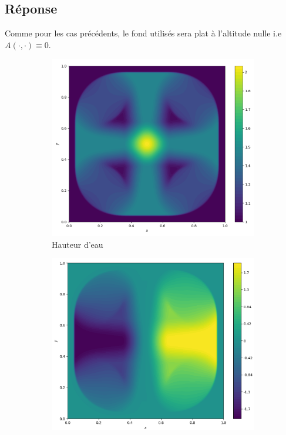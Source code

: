 \documentclass[
	french,
	11pt, %
]{fphw}
\begin{document}
\subsection*{Réponse} 
Comme pour les cas précédents, le fond utilisés sera plat à l'altitude nulle i.e $A(\cdot,\cdot) \equiv 0$. 


\begin{figure}[H]
	\centering
	\begin{subfigure}{0.32\textwidth}
		\centering
		\includegraphics[width=\textwidth,height=0.85\textwidth]{Riem3h.png}
		\caption{Hauteur d'eau}
		\label{fig:Riem3h}
	\end{subfigure}
	\begin{subfigure}{0.32\textwidth}
		\centering
		\includegraphics[width=\textwidth,height=0.85\textwidth]{Riem3u.png}

\end{subfigure}
\end{figure}
\end{document}

